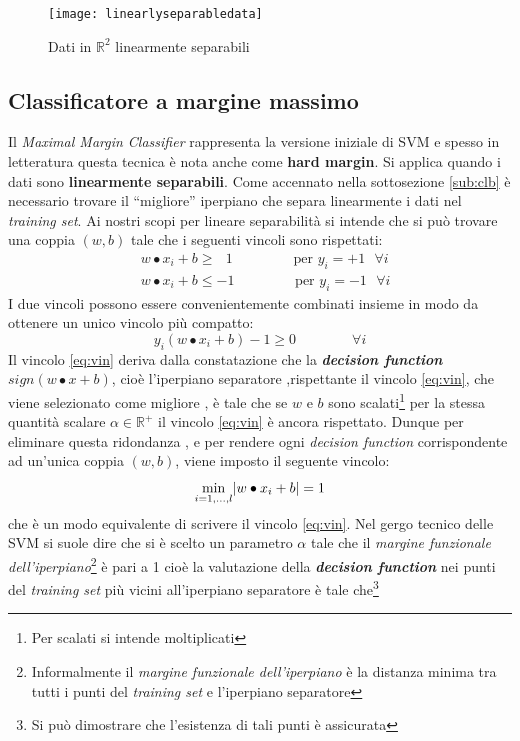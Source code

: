  \begin{figure}[htp]
	\centering
	\texttt{[image: linearlyseparabledata]}
	\caption[Lineare separabilità]{Dati in $\mathbb{R}^{2}$ linearmente separabili}
   \label{fig:lsd}
\end{figure}

\subsection{Classificatore  a margine massimo}
\label{sub:cmm}
Il \textit{Maximal Margin Classifier} rappresenta la versione iniziale di \ac{SVM} e spesso in letteratura questa tecnica è nota anche come \textbf{hard margin}. Si applica quando i dati sono \textbf{linearmente separabili}. Come accennato nella sottosezione \ref{sub:clb} è necessario trovare il ``migliore'' iperpiano che separa linearmente i dati nel \textit{training set}. Ai nostri scopi per lineare separabilità si intende che si può trovare una coppia $(w,b)$ tale che i seguenti vincoli sono rispettati:
\begin{align*}
&w \bullet x_i + b \geq \:\:\:1 \quad \quad \qquad\text{ per } y_i = +1 \:\:\:\forall i\\
&w \bullet x_i + b \leq -1 \quad \quad \qquad\text{ per } y_i = -1 \:\:\:\forall i
\end{align*}
I due vincoli possono essere convenientemente combinati insieme in modo da ottenere un unico vincolo più compatto:
\begin{equation}
\label{eq:vin}
y_i(w \bullet x_i + b) - 1 \geq 0 \qquad \qquad \forall i
\end{equation}
Il vincolo \eqref{eq:vin}  deriva dalla constatazione che la \textit{\textbf{decision function}} $sign(w \bullet x + b)$, cioè l'iperpiano separatore ,rispettante il vincolo \eqref{eq:vin}, che viene selezionato come migliore , è tale che se $w$ e $b$ sono scalati\footnote{Per scalati si intende moltiplicati} per la stessa quantità scalare $\alpha \in \mathbb{R}^{+}$  il vincolo \eqref{eq:vin} è ancora rispettato. Dunque per eliminare questa ridondanza , e per rendere ogni \textit{decision function} corrispondente ad un'unica coppia $(w,b)$, viene imposto il seguente vincolo:
\begin{equation}
\label{eq:vin2}
\min_{i=1,\dots,l}^{}\lvert w \bullet x_{i} + b\rvert = 1
\end{equation}
che è un modo equivalente di scrivere il vincolo \eqref{eq:vin}.  Nel gergo tecnico delle \ac{SVM} si suole dire che si è scelto un parametro $\alpha$ tale che il \textit{margine funzionale dell'iperpiano}\footnote{Informalmente il \textit{margine funzionale dell'iperpiano} è la distanza minima tra tutti i punti del \textit{training set} e l'iperpiano separatore} è pari a 1 cioè la valutazione della \textit{\textbf{decision function}} nei punti del \textit{training set}  più vicini all'iperpiano separatore è tale che\footnote{Si può dimostrare che l'esistenza di tali punti è assicurata}
